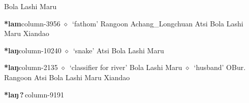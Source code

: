 \hspace{1ex}
         Bola 
\hspace{1ex}
         Lashi 
\hspace{1ex}
         Maru 
  \item {\footnotesize \textbf{*lam}}{\tiny column-3956}
         $\diamond$~`fathom'
         Rangoon 
\hspace{1ex}
         Achang\_Longchuan 
\hspace{1ex}
         Atsi 
\hspace{1ex}
         Bola 
\hspace{1ex}
         Lashi 
\hspace{1ex}
         Maru 
\hspace{1ex}
         Xiandao 
  \item {\footnotesize \textbf{*laŋ}}{\tiny column-10240}
         $\diamond$~`snake'
         Atsi 
\hspace{1ex}
         Bola 
\hspace{1ex}
         Lashi 
\hspace{1ex}
         Maru 
  \item {\footnotesize \textbf{*laŋ}}{\tiny column-2135}
         $\diamond$~`classifier for river'
         Bola 
\hspace{1ex}
         Lashi 
\hspace{1ex}
         Maru 
\hspace{1ex}
         $\diamond$~`husband'
         OBur. 
\hspace{1ex}
         Rangoon 
\hspace{1ex}
         Atsi 
\hspace{1ex}
         Bola 
\hspace{1ex}
         Lashi 
\hspace{1ex}
         Maru 
\hspace{1ex}
         Xiandao 
  \item {\footnotesize \textbf{*laŋ\,?\,}}{\tiny column-9191}
